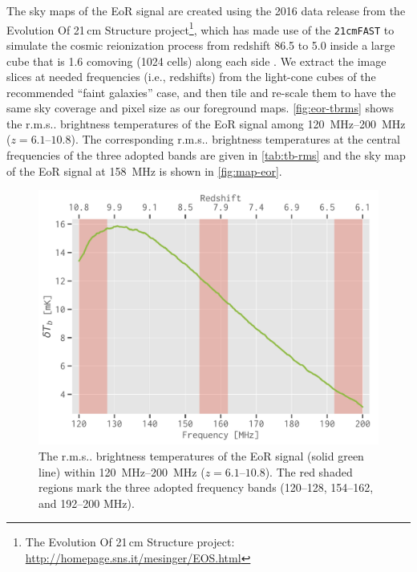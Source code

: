 \documentclass[twocolumn]{aastex62}
\makeatletter
\newcommand{\rms}{r.m.s\@ifnextchar.{}{.\@}}
\makeatother
\begin{document}
The sky maps of the EoR signal are created using the 2016 data release
from the Evolution Of 21\,cm Structure project\footnote{%
  The Evolution Of 21\,cm Structure project:
  \url{http://homepage.sns.it/mesinger/EOS.html}},
which has made use of the \texttt{21cmFAST} to simulate the cosmic
reionization process from redshift 86.5 to 5.0 inside a large cube that is
1.6 comoving \si{\Gpc} (1024 cells) along each side \citep{mesinger2016}.
We extract the image slices at needed frequencies (i.e., redshifts) from
the light-cone cubes of the recommended \enquote{faint galaxies} case,
and then tile and re-scale them to have the same sky coverage and
pixel size as our foreground maps.
\autoref{fig:eor-tbrms} shows the \rms{} brightness temperatures of the
EoR signal among \SIrange{120}{200}{\MHz} ($z = \numrange{6.1}{10.8}$).
The corresponding \rms{} brightness temperatures at the central
frequencies of the three adopted bands are given in \autoref{tab:tb-rms}
and the sky map of the EoR signal at \SI{158}{\MHz} is shown in
\autoref{fig:map-eor}.

\begin{figure}
  \centering
  \includegraphics[width=\columnwidth]{eos2016-tbrms}
  \caption{\label{fig:eor-tbrms}%
    The \rms{} brightness temperatures of the EoR signal
    (solid green line) within \SIrange{120}{200}{\MHz}
    ($z = \numrange{6.1}{10.8}$).
    The red shaded regions mark the three adopted frequency bands
    (\numrange{120}{128}, \numrange{154}{162}, and \numrange{192}{200}
    \si{\MHz}).
  }
\end{figure}
\end{document}
